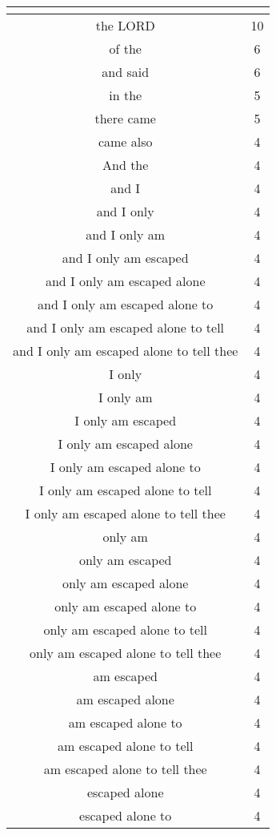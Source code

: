 \begin{center}
\begin{longtable}{|c|c|}
\hline \multicolumn{2}{c}{{ }} \\ \hline
\endfoot 
the LORD & 10\\ \hline 
of the & 6\\ \hline 
and said & 6\\ \hline 
in the & 5\\ \hline 
there came & 5\\ \hline 
came also & 4\\ \hline 
And the & 4\\ \hline 
and I & 4\\ \hline 
and I only & 4\\ \hline 
and I only am & 4\\ \hline 
and I only am escaped & 4\\ \hline 
and I only am escaped alone & 4\\ \hline 
and I only am escaped alone to & 4\\ \hline 
and I only am escaped alone to tell & 4\\ \hline 
and I only am escaped alone to tell thee & 4\\ \hline 
I only & 4\\ \hline 
I only am & 4\\ \hline 
I only am escaped & 4\\ \hline 
I only am escaped alone & 4\\ \hline 
I only am escaped alone to & 4\\ \hline 
I only am escaped alone to tell & 4\\ \hline 
I only am escaped alone to tell thee & 4\\ \hline 
only am & 4\\ \hline 
only am escaped & 4\\ \hline 
only am escaped alone & 4\\ \hline 
only am escaped alone to & 4\\ \hline 
only am escaped alone to tell & 4\\ \hline 
only am escaped alone to tell thee & 4\\ \hline 
am escaped & 4\\ \hline 
am escaped alone & 4\\ \hline 
am escaped alone to & 4\\ \hline 
am escaped alone to tell & 4\\ \hline 
am escaped alone to tell thee & 4\\ \hline 
escaped alone & 4\\ \hline 
escaped alone to & 4\\ \hline 

\end{longtable}
\end{center}

